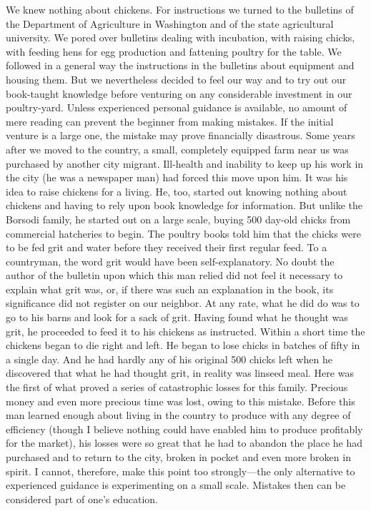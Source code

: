 \documentclass{book}
\begin{document}
We knew nothing about chickens. For instructions we turned to the bulletins of the Department of Agriculture in Washington and of the state agricultural university. We pored over bulletins dealing with incubation, with raising chicks, with feeding hens for egg production and fattening poultry for the table. We followed in a general way the instructions in the bulletins about equipment and housing them. But we nevertheless decided to feel our way and to try out our book-taught knowledge before venturing on any considerable investment in our poultry-yard. Unless experienced personal guidance is available, no amount of mere reading can prevent the beginner from making mistakes. If the initial venture is a large one, the mistake may prove financially disastrous. Some years after we moved to the country, a small, completely equipped farm near us was purchased by another city migrant. Ill-health and inability to keep up his work in the city (he was a newspaper man) had forced this move upon him. It was his idea to raise chickens for a living. He, too, started out knowing nothing about chickens and having to rely upon book knowledge for information. But unlike the Borsodi family, he started out on a large scale, buying 500 day-old chicks from commercial hatcheries to begin. The poultry books told him that the chicks were to be fed grit and water before they received their first regular feed. To a countryman, the word grit would have been self-explanatory. No doubt the author of the bulletin upon which this man relied did not feel it necessary to explain what grit was, or, if there was such an explanation in the book, its significance did not register on our neighbor. At any rate, what he did do was to go to his barns and look for a sack of grit. Having found what he thought was grit, he proceeded to feed it to his chickens as instructed. Within a short time the chickens began to die right and left. He began to lose chicks in batches of fifty in a single day. And he had hardly any of his original 500 chicks left when he discovered that what he had thought grit, in reality was linseed meal. Here was the first of what proved a series of catastrophic losses for this family. Precious money and even more precious time was lost, owing to this mistake. Before this man learned enough about living in the country to produce with any degree of efficiency (though I believe nothing could have enabled him to produce profitably for the market), his losses were so great that he had to abandon the place he had purchased and to return to the city, broken in pocket and even more broken in spirit. I cannot, therefore, make this point too strongly—the only alternative to experienced guidance is experimenting on a small scale. Mistakes then can be considered part of one’s education.
\end{document}
